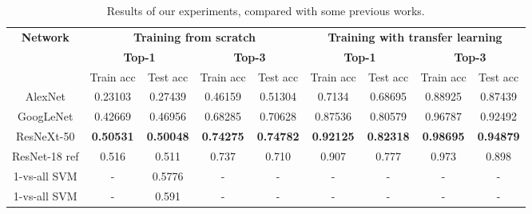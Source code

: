 \documentclass{article}
\begin{document}
\begin{table}[ht]
	\centering
	\begin{tabular}{|c|c|c|c|c|c|c|c|c|}
		\hline
		\multirow{3}{*}{\textbf{Network}}                                & \multicolumn{4}{c|}{\textbf{Training from scratch}}                       & \multicolumn{4}{c|}{\textbf{Training with transfer learning}}             \\ \cline{2-9} 
		& \multicolumn{2}{c|}{\textbf{Top-1}} & \multicolumn{2}{c|}{\textbf{Top-3}} & \multicolumn{2}{c|}{\textbf{Top-1}} & \multicolumn{2}{c|}{\textbf{Top-3}} \\ \cline{2-9} 
		& Train acc        & Test acc         & Train acc        & Test acc         & Train acc        & Test acc         & Train acc        & Test acc         \\ \hline
		AlexNet                                                          & 0.23103          & 0.27439          & 0.46159          & 0.51304          & 0.7134           & 0.68695          & 0.88925          & 0.87439          \\ \hline
		GoogLeNet                                                        & 0.42669          & 0.46956          & 0.68285          & 0.70628          & 0.87536          & 0.80579          & 0.96787          & 0.92492          \\ \hline
		ResNeXt-50                                                       & \textbf{0.50531} & \textbf{0.50048} & \textbf{0.74275} & \textbf{0.74782} & \textbf{0.92125} & \textbf{0.82318} & \textbf{0.98695} & \textbf{0.94879} \\ \hline
		ResNet-18 ref                                                    & 0.516            & 0.511            & 0.737            & 0.710            & 0.907            & 0.777            & 0.973            & 0.898            \\ \hline
		1-vs-all SVM \cite{Saleh2015}                   & -                & 0.5776           & -                & -                & -                & -                & -                & -                \\ \hline
		1-vs-all SVM \cite{mensink2014} & -                & 0.591            & -                & -                & -                & -                & -                & -                \\ \hline
	\end{tabular}
	\caption{Results of our experiments, compared with some previous works.}
	\label{tab:results}
\end{table}
\end{document}
